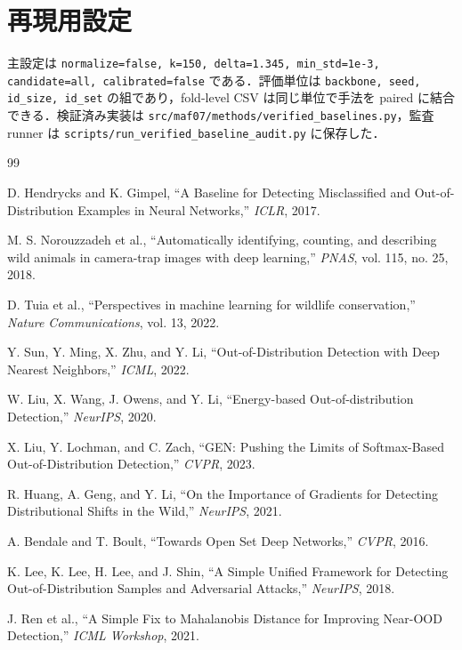 \documentclass[uplatex,dvipdfmx,a4paper,10pt,twocolumn]{bxjsarticle}
\begin{document}
\section{再現用設定}

主設定は \texttt{normalize=false, k=150, delta=1.345, min\_std=1e-3, candidate=all, calibrated=false} である．評価単位は \texttt{backbone, seed, id\_size, id\_set} の組であり，fold-level CSV は同じ単位で手法を paired に結合できる．検証済み実装は \texttt{src/maf07/methods/verified\_baselines.py}，監査 runner は \texttt{scripts/run\_verified\_baseline\_audit.py} に保存した．

\begin{thebibliography}{99}

D. Hendrycks and K. Gimpel,
``A Baseline for Detecting Misclassified and Out-of-Distribution Examples in Neural Networks,''
\textit{ICLR}, 2017.

M. S. Norouzzadeh et al.,
``Automatically identifying, counting, and describing wild animals in camera-trap images with deep learning,''
\textit{PNAS}, vol. 115, no. 25, 2018.

D. Tuia et al.,
``Perspectives in machine learning for wildlife conservation,''
\textit{Nature Communications}, vol. 13, 2022.

Y. Sun, Y. Ming, X. Zhu, and Y. Li,
``Out-of-Distribution Detection with Deep Nearest Neighbors,''
\textit{ICML}, 2022.

W. Liu, X. Wang, J. Owens, and Y. Li,
``Energy-based Out-of-distribution Detection,''
\textit{NeurIPS}, 2020.

X. Liu, Y. Lochman, and C. Zach,
``GEN: Pushing the Limits of Softmax-Based Out-of-Distribution Detection,''
\textit{CVPR}, 2023.

R. Huang, A. Geng, and Y. Li,
``On the Importance of Gradients for Detecting Distributional Shifts in the Wild,''
\textit{NeurIPS}, 2021.

A. Bendale and T. Boult,
``Towards Open Set Deep Networks,''
\textit{CVPR}, 2016.

K. Lee, K. Lee, H. Lee, and J. Shin,
``A Simple Unified Framework for Detecting Out-of-Distribution Samples and Adversarial Attacks,''
\textit{NeurIPS}, 2018.

J. Ren et al.,
``A Simple Fix to Mahalanobis Distance for Improving Near-OOD Detection,''
\textit{ICML Workshop}, 2021.


\end{thebibliography}
\end{document}
